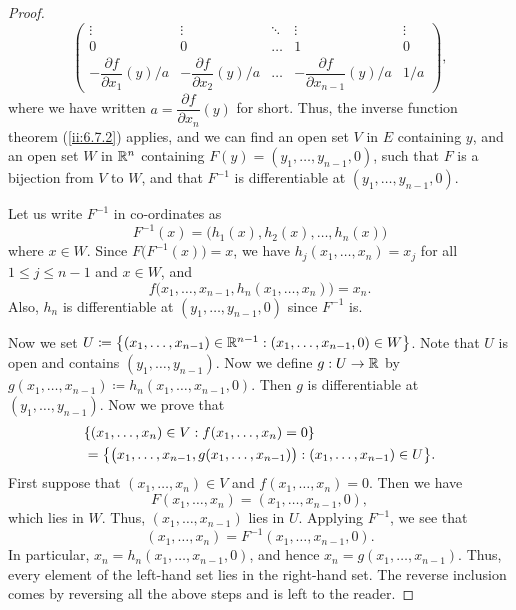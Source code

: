 \begin{proof}
\[\begin{pmatrix}
      \vdots                                   & \vdots                                   & \ddots & \vdots                                         & \vdots \\
      0                                        & 0                                        & \dots  & 1                                              & 0      \\
      -\dfrac{\partial f}{\partial x_1}(y) / a & -\dfrac{\partial f}{\partial x_2}(y) / a & \dots  & -\dfrac{\partial f}{\partial x_{n - 1}}(y) / a & 1 / a
    \end{pmatrix},
  \]
  where we have written \(a = \dfrac{\partial f}{\partial x_n}(y)\) for short.
  Thus, the inverse function theorem (\cref{ii:6.7.2}) applies, and we can find an open set \(V\) in \(E\) containing \(y\), and an open set \(W\) in \(\mathbb{R}^n\) containing \(F(y) = (y_1, \dots, y_{n - 1}, 0)\), such that \(F\) is a bijection from \(V\) to \(W\), and that \(F^{-1}\) is differentiable at \((y_1, \dots, y_{n - 1}, 0)\).

  Let us write \(F^{-1}\) in co-ordinates as
  \[
    F^{-1}(x) = \big(h_1(x), h_2(x), \dots, h_n(x)\big)
  \]
  where \(x \in W\).
  Since \(F\big(F^{-1}(x)\big) = x\), we have \(h_j(x_1, \dots, x_n) = x_j\) for all \(1 \leq j \leq n - 1\) and \(x \in W\), and
  \[
    f\big(x_1, \dots, x_{n - 1}, h_n(x_1, \dots, x_n)\big) = x_n.
  \]
  Also, \(h_n\) is differentiable at \((y_1, \dots, y_{n - 1}, 0)\) since \(F^{-1}\) is.

  Now we set \(U \coloneqq \left\lbrace(x_1, \dots, x_{n - 1}) \in \mathbb{R}^{n - 1} : (x_1, \dots, x_{n - 1}, 0) \in W\right\rbrace\).
  Note that \(U\) is open and contains \((y_1, \dots, y_{n - 1})\).
  Now we define \(g : U \to \mathbb{R}\) by \(g(x_1, \dots, x_{n - 1}) \coloneqq h_n(x_1, \dots, x_{n - 1}, 0)\).
  Then \(g\) is differentiable at \((y_1, \dots, y_{n - 1})\).
  Now we prove that
  \begin{align*}
     & \set{(x_1, \dots, x_n) \in V : f(x_1, \dots, x_n) = 0}                                             \\
     & = \set{\big(x_1, \dots, x_{n - 1}, g(x_1, \dots, x_{n - 1})\big) : (x_1, \dots, x_{n - 1}) \in U}.
  \end{align*}
  First suppose that \((x_1, \dots, x_n) \in V\) and \(f(x_1, \dots, x_n) = 0\).
  Then we have
  \[
    F(x_1, \dots, x_n) = (x_1, \dots, x_{n - 1}, 0),
  \]
  which lies in \(W\).
  Thus, \((x_1, \dots, x_{n - 1})\) lies in \(U\).
  Applying \(F^{-1}\), we see that
  \[
    (x_1, \dots, x_n) = F^{-1}(x_1, \dots, x_{n - 1}, 0).
  \]
  In particular, \(x_n = h_n(x_1, \dots, x_{n - 1}, 0)\), and hence \(x_n = g(x_1, \dots, x_{n - 1})\).
  Thus, every element of the left-hand set lies in the right-hand set.
  The reverse inclusion comes by reversing all the above steps and is left to the reader.


\end{proof}
